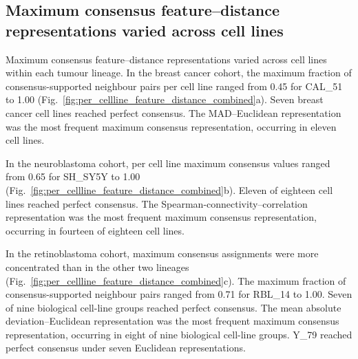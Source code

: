 \subsection{Maximum consensus feature--distance representations varied across cell lines}

Maximum consensus feature--distance representations varied across cell lines
within each tumour lineage. In the breast cancer cohort, the maximum fraction
of consensus-supported neighbour pairs per cell line ranged from 0.45 for
CAL\_51 to 1.00 (Fig.~\ref{fig:per_cellline_feature_distance_combined}a).
Seven breast cancer cell lines reached perfect consensus. The MAD--Euclidean
representation was the most frequent maximum consensus representation,
occurring in eleven cell lines.

In the neuroblastoma cohort, per cell line maximum consensus values ranged
from 0.65 for SH\_SY5Y to 1.00 (Fig.~\ref{fig:per_cellline_feature_distance_combined}b).
Eleven of eighteen cell lines reached perfect consensus. The
Spearman-connectivity--correlation representation was the most frequent
maximum consensus representation, occurring in fourteen of eighteen cell lines.

In the retinoblastoma cohort, maximum consensus assignments were more
concentrated than in the other two lineages (Fig.~\ref{fig:per_cellline_feature_distance_combined}c).
The maximum fraction of consensus-supported neighbour pairs ranged from 0.71
for RBL\_14 to 1.00. Seven of nine biological cell-line groups reached perfect consensus. The
mean absolute deviation--Euclidean representation was the most frequent
maximum consensus representation, occurring in eight of nine biological cell-line groups.
Y\_79 reached perfect consensus under seven Euclidean representations.

